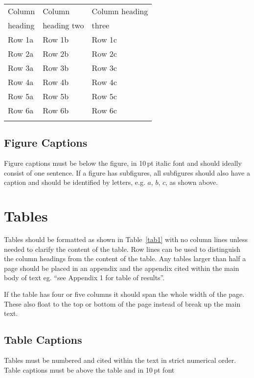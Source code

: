 \documentclass{cta-author}
\begin{document}
\begin{table}[!b]
{\begin{tabular*}{20pc}{@{\extracolsep{\fill}}lll@{}}\toprule
Column  &Column  & Column heading \\
heading  &heading two &  three \\
\midrule
Row 1a  &Row 1b  &Row 1c \\
Row 2a  &Row 2b  &Row 2c \\
Row 3a  &Row 3b  & Row 3c \\
Row 4a  &Row 4b  &Row 4c \\
Row 5a  &Row 5b  &Row 5c \\
Row 6a  & Row 6b  & Row 6c \\
\botrule
\end{tabular*}}{}
\end{table}

\subsection{Figure Captions}\label{subsec6.1}

Figure captions must be below the figure, in 10\,pt italic
font and should ideally consist of one sentence. If a
figure has subfigures, all subfigures should also have a
caption and should be identified by letters, e.g. $a$, $b$,
$c$, as shown above.

\section{Tables}\label{sec7}

Tables should be formatted as shown in Table~\ref{tab1}
with no column lines unless needed to clarify the content
of the table. Row lines can be used to distinguish the
column headings from the content of the table. Any tables
larger than half a page should be placed in an appendix and
the appendix cited within the main body of text eg. ``see
Appendix 1 for table of results''.

If the table has four or five columns it should span the
whole width of the page. These also float to the top or
bottom of the page instead of break up the main text.

\subsection{Table Captions}\label{subsec7.1}

Tables must be numbered and cited within the text in strict
numerical order. Table captions must be above the table and
in 10\,pt font
\end{document}

